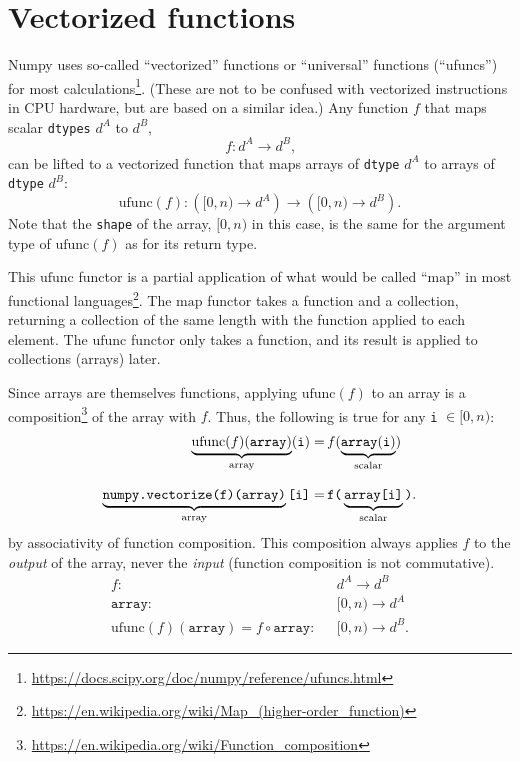 \documentclass[12pt]{article}
\begin{document}
\section*{Vectorized functions}

Numpy uses so-called ``vectorized'' functions or ``universal'' functions (``ufuncs'') for most calculations\footnote{\url{https://docs.scipy.org/doc/numpy/reference/ufuncs.html}}. (These are not to be confused with vectorized instructions in CPU hardware, but are based on a similar idea.) Any function $f$ that maps scalar \texttt{dtypes} $d^A$ to $d^B$,
\[ f: d^A \to d^B\mbox{,} \]
\noindent can be lifted to a vectorized function that maps arrays of \texttt{dtype} $d^A$ to arrays of \texttt{dtype} $d^B$:
\[ \mbox{ufunc}(f): \left([0, n) \to d^A\right) \to \left([0, n) \to d^B\right)\mbox{.} \]
\noindent Note that the \texttt{shape} of the array, $[0, n)$ in this case, is the same for the argument type of $\mbox{ufunc}(f)$ as for its return type.

This $\mbox{ufunc}$ functor is a partial application of what would be called ``$\mbox{map}$'' in most functional languages\footnote{\url{https://en.wikipedia.org/wiki/Map_(higher-order_function)}}. The $\mbox{map}$ functor takes a function and a collection, returning a collection of the same length with the function applied to each element. The $\mbox{ufunc}$ functor only takes a function, and its result is applied to collections (arrays) later.

Since arrays are themselves functions, applying $\mbox{ufunc}(f)$ to an array is a composition\footnote{\url{https://en.wikipedia.org/wiki/Function_composition}} of the array with $f$. Thus, the following is true for any \texttt{i} $\in [0, n)$:
\begin{align*}
\underbrace{\mbox{ufunc}(f)(\texttt{array})}_{\mbox{\scriptsize array}}(\texttt{i}) = & \,f(\underbrace{\texttt{array}(\texttt{i})}_{\mbox{\scriptsize scalar}}) \\[0.5\baselineskip]
\underbrace{\texttt{numpy.vectorize(f)(array)}}_{\mbox{\scriptsize array}}\texttt{[i]} = & \,\texttt{f(}\underbrace{\texttt{array[i]}}_{\mbox{\scriptsize scalar}}\texttt{)}\mbox{.}
\end{align*}
\noindent by associativity of function composition. This composition always applies $f$ to the {\it output} of the array, never the {\it input} (function composition is not commutative).
\begin{align*}
f: & \mbox{ } d^A \to d^B \\
\texttt{array}: & \mbox{ } [0, n) \to d^A \\
\mbox{ufunc}(f)(\texttt{array}) = f \circ \texttt{array} : & \mbox{ } [0, n) \to d^B\mbox{.}
\end{align*}
\end{document}
